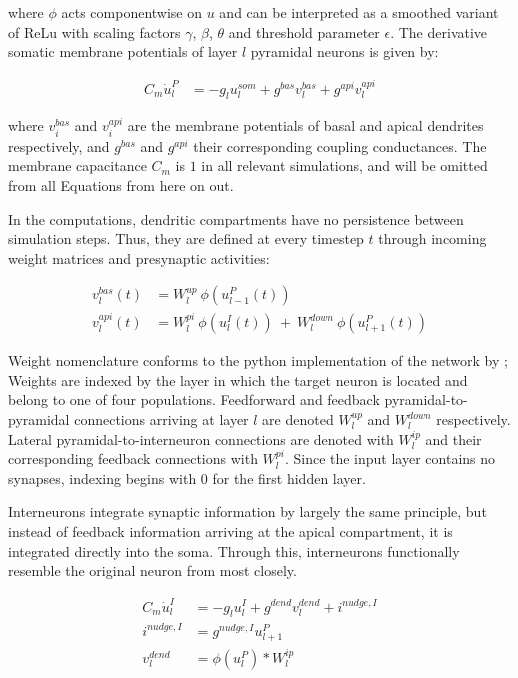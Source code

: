 where $\phi$ acts componentwise on $u$ and can be interpreted as a smoothed variant of ReLu  with scaling 
factors $\gamma$, $\beta$, $\theta$ and threshold parameter $\epsilon$. The derivative somatic membrane potentials 
of layer $l$ pyramidal neurons is given by:

\begin{align}
  C_m \dot{u}_l^P & = - g_l u_l^{som} + g^{bas} v_l^{bas} + g^{api} v_l^{api}
\end{align}

where $v_i^{bas}$ and $v_i^{api}$ are the membrane potentials of basal and apical dendrites respectively, and $g^{bas}$
and $g^{api}$ their corresponding coupling conductances. The membrane capacitance $C_m$ is $1$ in all relevant simulations,
and will be omitted from all Equations from here on out.


In the computations, dendritic compartments have no persistence
between simulation steps. Thus, they are defined at every timestep $t$ through incoming weight matrices and
presynaptic activities:

\begin{align}
  v_l^{bas}(t) & = W_l^{up} \ \phi(u_{l-1}^P(t))                                     \\
  v_l^{api}(t) & =  W_l^{pi} \ \phi(u_l^I(t)) \ + \  W_l^{down} \ \phi(u_{l+1}^P(t))
\end{align}

Weight nomenclature conforms to the python implementation of the network by \cite{Haider2021}; Weights are indexed by
the layer in which the target neuron is located and belong to one of four populations. Feedforward and 
feedback pyramidal-to-pyramidal connections arriving at layer $l$
are denoted $W_l^{up}$ and $W_l^{down}$ respectively. Lateral pyramidal-to-interneuron connections are denoted with $W_l^{ip}$
and their corresponding feedback connections with $W_l^{pi}$. Since the input layer contains no synapses, indexing begins
with $0$ for the first hidden layer. \newline

Interneurons integrate synaptic information by largely the same principle, but
instead of feedback information arriving at the apical compartment, it is integrated directly into the soma. Through
this, interneurons functionally resemble the original neuron from \cite{urbanczik2014learning} most closely.

\begin{align}
  C_m \dot{u}_l^I & = - g_l u_l^{I} + g^{dend} v_l^{dend} + i^{nudge, I}\label{eq-intn-dynamics} \\
  i^{nudge, I}    & = g^{nudge, I} u_{l+1}^P                             \\
  v_l^{dend}      & = \phi(u_{l}^P) * W_l^{ip}
\end{align}

